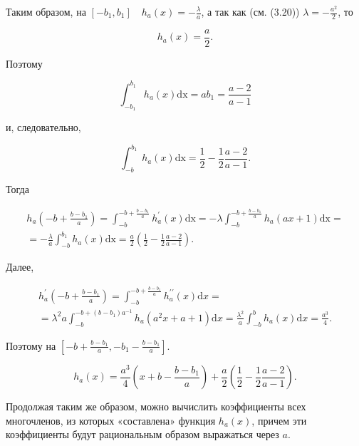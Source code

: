 \documentclass[10pt]{article}
\begin{document}
Таким образом, на $\left[-b_{1}, b_{1}\right] \quad h_{a}(x)=-\frac{\lambda}{a}$, а так как (см. (3.20)) $\lambda=-\frac{a^{2}}{2}$, то


\begin{equation*}
h_{a}(x)=\frac{a}{2} . \tag{3.40}
\end{equation*}


Поэтому


\begin{equation*}
\int_{-b_{1}}^{b_{1}} h_{a}(x) \mathrm{dx}=a b_{1}=\frac{a-2}{a-1} \tag{3.41}
\end{equation*}


и, следовательно,


\begin{equation*}
\int_{-b}^{b_{1}} h_{a}(x) \mathrm{dx}=\frac{1}{2}-\frac{1}{2} \frac{a-2}{a-1} . \tag{3.42}
\end{equation*}


Тогда


\begin{gather*}
h_{a}\left(-b+\frac{b-b_{1}}{a}\right)=\int_{-b}^{-b+\frac{b-b_{1}}{a}} h_{a}^{\prime}(x) \mathrm{dx}=-\lambda \int_{-b}^{-b+\frac{b-b_{1}}{a}} h_{a}(a x+1) \mathrm{dx}= \\
=-\frac{\lambda}{a} \int_{-b}^{b_{1}} h_{a}(x) \mathrm{dx}=\frac{a}{2}\left(\frac{1}{2}-\frac{1}{2} \frac{a-2}{a-1}\right) . \tag{3.43}
\end{gather*}


Далее,


\begin{gather*}
h_{a}^{\prime}\left(-b+\frac{b-b_{1}}{a}\right)=\int_{-b}^{-b+\frac{b-b_{1}}{a}} h_{a}^{\prime \prime}(x) \mathrm{d} x= \\
=\lambda^{2} a \int_{-b}^{-b+\left(b-b_{1}\right) a^{-1}} h_{a}\left(a^{2} x+a+1\right) \mathrm{d} x=\frac{\lambda^{2}}{a} \int_{-b}^{b} h_{a}(x) \mathrm{d} x=\frac{a^{3}}{4} . \tag{3.44}
\end{gather*}


Поэтому на $\left[-b+\frac{b-b_{1}}{a},-b_{1}-\frac{b-b_{1}}{a}\right]$.


\begin{equation*}
h_{a}(x)=\frac{a^{3}}{4}\left(x+b-\frac{b-b_{1}}{a}\right)+\frac{a}{2}\left(\frac{1}{2}-\frac{1}{2} \frac{a-2}{a-1}\right) . \tag{3.45}
\end{equation*}


Продолжая таким же образом, можно вычислить коэффициенты всех многочленов, из которых «составлена» функция $h_{a}(x)$, причем эти коэффициенты будут рациональным образом выражаться через $a$.
\end{document}
